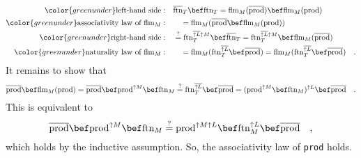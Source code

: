\begin{align*}
{\color{greenunder}\text{left-hand side}:}\quad & \overline{\text{ftn}}_{T}\bef\text{ftn}_{T}=\text{flm}_{M}(\overline{\text{prod}})\bef\text{flm}_{M}(\text{prod})\\
{\color{greenunder}\text{associativity law of }\text{flm}_{M}:}\quad & \quad=\text{flm}_{M}(\overline{\text{prod}}\bef\text{flm}_{M}(\text{prod}))\\
{\color{greenunder}\text{right-hand side}:}\quad & \overset{?}{=}\text{ftn}_{T}^{\overline{\uparrow L}\uparrow M}\bef\overline{\text{ftn}}_{T}=\text{ftn}_{T}^{\overline{\uparrow L}\uparrow M}\bef\text{flm}_{M}(\overline{\text{prod}})\\
{\color{greenunder}\text{naturality law of }\text{flm}_{M}:}\quad & \quad=\text{flm}_{M}(\text{ftn}_{T}^{\overline{\uparrow L}}\bef\overline{\text{prod}})=\text{flm}_{M}(\text{ftn}_{T}^{\overline{\uparrow L}}\bef\overline{\text{prod}})\quad.
\end{align*}
It remains to show that
\[
\overline{\text{prod}}\bef\text{flm}_{M}(\text{prod})=\overline{\text{prod}}\bef\text{prod}^{\uparrow M}\bef\text{ftn}_{M}\overset{?}{=}\text{ftn}_{T}^{\overline{\uparrow L}}\bef\overline{\text{prod}}=(\text{prod}^{\uparrow M}\bef\text{ftn}_{M})^{\uparrow L}\bef\overline{\text{prod}}\quad.
\]
This is equivalent to
\[
\overline{\text{prod}}\bef\text{prod}^{\uparrow M}\bef\text{ftn}_{M}\overset{?}{=}\text{prod}^{\uparrow M\uparrow L}\bef\text{ftn}_{M}^{\uparrow L}\bef\overline{\text{prod}}\quad,
\]
which holds by the inductive assumption. So, the associativity law
of \lstinline!prod! holds.

